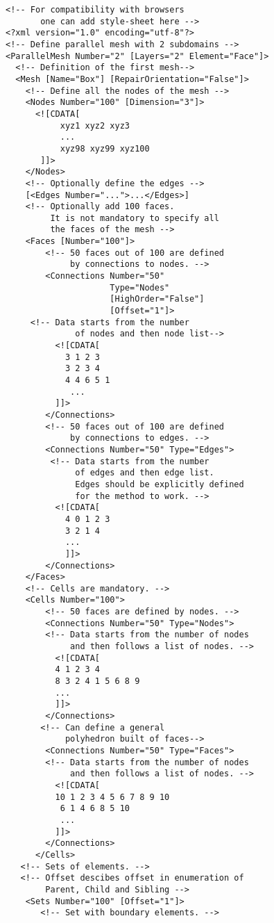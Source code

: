 \documentclass[14pt]{article}
\begin{document}
\begin{lstlisting}
<!-- For compatibility with browsers 
       one can add style-sheet here -->
<?xml version="1.0" encoding="utf-8"?>
<!-- Define parallel mesh with 2 subdomains -->
<ParallelMesh Number="2" [Layers="2" Element="Face"]>
  <!-- Definition of the first mesh--> 
  <Mesh [Name="Box"] [RepairOrientation="False"]>
    <!-- Define all the nodes of the mesh -->
    <Nodes Number="100" [Dimension="3"]>
      <![CDATA[ 
           xyz1 xyz2 xyz3 
           ... 
           xyz98 xyz99 xyz100 
       ]]>
    </Nodes>
    <!-- Optionally define the edges -->
    [<Edges Number="...">...</Edges>]
    <!-- Optionally add 100 faces.
         It is not mandatory to specify all 
         the faces of the mesh -->
    <Faces [Number="100"]>
        <!-- 50 faces out of 100 are defined 
             by connections to nodes. -->
        <Connections Number="50" 
                     Type="Nodes" 
                     [HighOrder="False"]
                     [Offset="1"]> 
	 <!-- Data starts from the number 
              of nodes and then node list-->
          <![CDATA[
            3 1 2 3
            3 2 3 4
            4 4 6 5 1
             ...
          ]]>
        </Connections>
        <!-- 50 faces out of 100 are defined 
             by connections to edges. -->
        <Connections Number="50" Type="Edges"> 
         <!-- Data starts from the number 
              of edges and then edge list.
              Edges should be explicitly defined 
              for the method to work. -->
          <![CDATA[
            4 0 1 2 3
            3 2 1 4
            ...
            ]]>
        </Connections>
    </Faces>
    <!-- Cells are mandatory. -->
    <Cells Number="100">
        <!-- 50 faces are defined by nodes. -->
        <Connections Number="50" Type="Nodes"> 
        <!-- Data starts from the number of nodes 
             and then follows a list of nodes. -->
          <![CDATA[
          4 1 2 3 4
          8 3 2 4 1 5 6 8 9 
          ...
          ]]> 
        </Connections>
       <!-- Can define a general 
            polyhedron built of faces-->
        <Connections Number="50" Type="Faces"> 
        <!-- Data starts from the number of nodes 
             and then follows a list of nodes. -->
          <![CDATA[
          10 1 2 3 4 5 6 7 8 9 10 
           6 1 4 6 8 5 10 
           ...
          ]]> 
        </Connections>
      </Cells>
   <!-- Sets of elements. -->
   <!-- Offset descibes offset in enumeration of 
        Parent, Child and Sibling -->
    <Sets Number="100" [Offset="1"]>
       <!-- Set with boundary elements. -->

\end{lstlisting}
\end{document}
